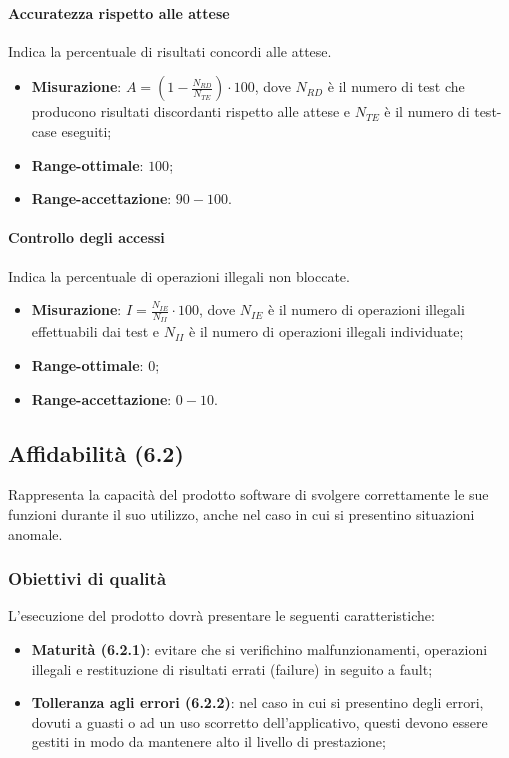 \paragraph{Accuratezza rispetto alle attese}
Indica la percentuale di risultati concordi alle attese.
\begin{itemize}
\item \textbf{Misurazione}: $A=(1-\frac{N_{RD}}{N_{TE}}) \cdot 100$, dove $N_{RD}$ è il numero di test che producono risultati discordanti rispetto alle attese e $N_{TE}$ è il numero di test-case eseguiti;
\item \textbf{Range-ottimale}: $100$;
\item \textbf{Range-accettazione}: $90 - 100$.
\end{itemize}
\paragraph{Controllo degli accessi}
Indica la percentuale di operazioni illegali non bloccate.
\begin{itemize}
\item \textbf{Misurazione}: $I=\frac{N_{IE}}{N_{II}} \cdot 100$, dove $N_{IE}$ è il numero di operazioni illegali effettuabili dai test e $N_{II}$ è il numero di operazioni illegali individuate;
\item \textbf{Range-ottimale}: $0$;
\item \textbf{Range-accettazione}: $0 - 10$.
\end{itemize}


\subsection{Affidabilità (6.2)}
Rappresenta la capacità del prodotto software di svolgere correttamente le sue funzioni durante il suo utilizzo, anche nel caso in cui si presentino situazioni anomale.
\subsubsection{Obiettivi di qualità}
L'esecuzione del prodotto dovrà presentare le seguenti caratteristiche:
\begin{itemize}
\item \textbf{Maturità (6.2.1)}: evitare che si verifichino malfunzionamenti, operazioni illegali e restituzione di risultati errati (failure) in seguito a fault;
\item \textbf{Tolleranza agli errori (6.2.2)}: nel caso in cui si presentino degli errori, dovuti a guasti o ad un uso scorretto dell'applicativo, questi devono essere gestiti in modo da mantenere alto il livello di prestazione;
\end{itemize}
